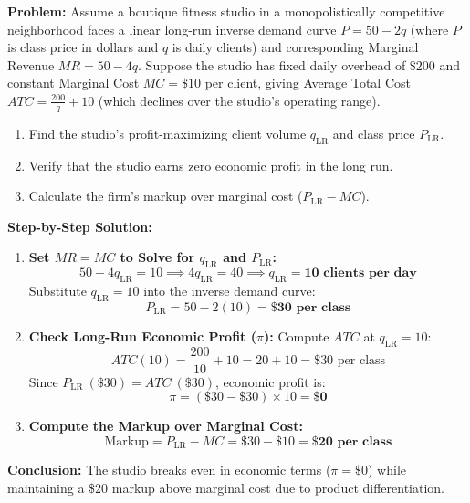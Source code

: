 \documentclass[11pt,letterpaper]{article}
\begin{document}
\begin{tcolorbox}[colback=LightSlate,colframe=CourseTeal,title=\textbf{Work It Out: Long-Run Equilibrium for a Boutique Fitness Studio}]
\noindent\textbf{Problem:}
Assume a boutique fitness studio in a monopolistically competitive neighborhood faces a linear long-run inverse demand curve $P = 50 - 2q$ (where $P$ is class price in dollars and $q$ is daily clients) and corresponding Marginal Revenue $MR = 50 - 4q$. Suppose the studio has fixed daily overhead of $\$200$ and constant Marginal Cost $MC = \$10$ per client, giving Average Total Cost $ATC = \frac{200}{q} + 10$ (which declines over the studio's operating range).
\begin{enumerate}
    \item Find the studio's profit-maximizing client volume $q_{\text{LR}}$ and class price $P_{\text{LR}}$.
    \item Verify that the studio earns zero economic profit in the long run.
    \item Calculate the firm's markup over marginal cost ($P_{\text{LR}} - MC$).
\end{enumerate}

\noindent\textbf{Step-by-Step Solution:}
\begin{enumerate}
    \item \textbf{Set $MR = MC$ to Solve for $q_{\text{LR}}$ and $P_{\text{LR}}$:}
    \[
    50 - 4q_{\text{LR}} = 10 \implies 4q_{\text{LR}} = 40 \implies q_{\text{LR}} = \mathbf{10\text{ clients per day}}
    \]
    Substitute $q_{\text{LR}} = 10$ into the inverse demand curve:
    \[
    P_{\text{LR}} = 50 - 2(10) = \mathbf{\$30\text{ per class}}
    \]

    \item \textbf{Check Long-Run Economic Profit ($\pi$):}
    Compute $ATC$ at $q_{\text{LR}} = 10$:
    \[
    ATC(10) = \frac{200}{10} + 10 = 20 + 10 = \$30\text{ per class}
    \]
    Since $P_{\text{LR}}\ (\$30) = ATC\ (\$30)$, economic profit is:
    \[
    \pi = (\$30 - \$30) \times 10 = \mathbf{\$0}
    \]

    \item \textbf{Compute the Markup over Marginal Cost:}
    \[
    \text{Markup} = P_{\text{LR}} - MC = \$30 - \$10 = \mathbf{\$20\text{ per class}}
    \]
\end{enumerate}
\textbf{Conclusion:} The studio breaks even in economic terms ($\pi = \$0$) while maintaining a $\$20$ markup above marginal cost due to product differentiation.
\end{tcolorbox}
\end{document}
